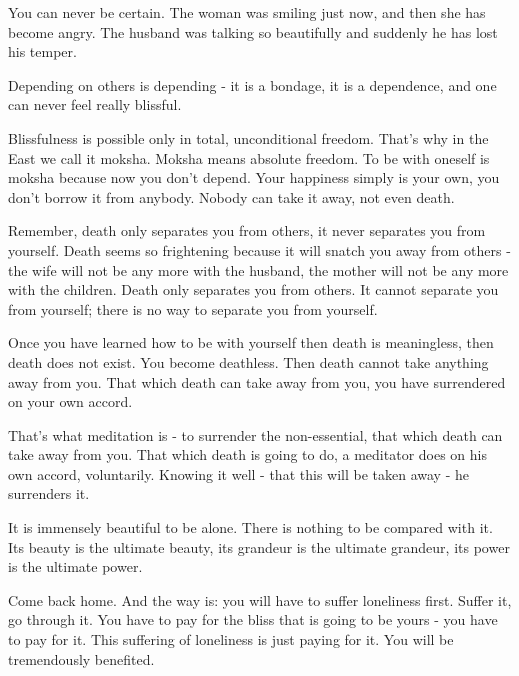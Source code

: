 You can never be certain. The woman was smiling just now, and then she has become angry. The husband was talking so beautifully and suddenly he has lost his temper.

Depending on others is depending - it is a bondage, it is a dependence, and one can never feel really blissful.

Blissfulness is possible only in total, unconditional freedom. That's why in the East we call it moksha. Moksha means absolute freedom. To be with oneself is moksha because now you don't depend. Your happiness simply is your own, you don't borrow it from anybody. Nobody can take it away, not even death.

Remember, death only separates you from others, it never separates you from yourself. Death seems so frightening because it will snatch you away from others - the wife will not be any more with the husband, the mother will not be any more with the children. Death only separates you from others. It cannot separate you from yourself; there is no way to separate you from yourself.

Once you have learned how to be with yourself then death is meaningless, then death does not exist. You become deathless. Then death cannot take anything away from you. That which death can take away from you, you have surrendered on your own accord.

That's what meditation is - to surrender the non-essential, that which death can take away from you. That which death is going to do, a meditator does on his own accord, voluntarily. Knowing it well - that this will be taken away - he surrenders it.

It is immensely beautiful to be alone. There is nothing to be compared with it. Its beauty is the ultimate beauty, its grandeur is the ultimate grandeur, its power is the ultimate power.

Come back home. And the way is: you will have to suffer loneliness first. Suffer it, go through it. You have to pay for the bliss that is going to be yours - you have to pay for it. This suffering of loneliness is just paying for it. You will be tremendously benefited.